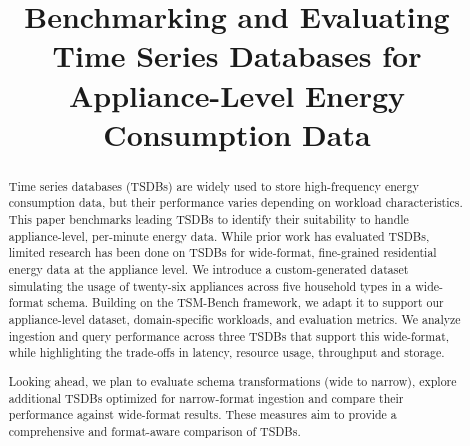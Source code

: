 \documentclass[conference]{IEEEtran}
\begin{document}
\title{Benchmarking and Evaluating Time Series Databases for Appliance-Level Energy Consumption Data\\
}

\author{
\and
{}
\and
{}
}

\maketitle

\begin{abstract}
Time series databases (TSDBs) are widely used to store high-frequency energy consumption data, but their performance varies depending on workload characteristics. This paper benchmarks leading TSDBs to identify their suitability to handle appliance-level, per-minute energy data. While prior work has evaluated TSDBs, limited research has been done on TSDBs for wide-format, fine-grained residential energy data at the appliance level. We introduce a custom-generated dataset simulating the usage of twenty-six appliances across five household types in a wide-format schema. Building on the TSM-Bench framework, we adapt it to support our appliance-level dataset, domain-specific workloads, and evaluation metrics. We analyze ingestion and query performance across three TSDBs that support this wide-format, while highlighting the trade-offs in latency, resource usage, throughput and storage.

Looking ahead, we plan to evaluate schema transformations (wide to narrow), explore additional TSDBs optimized for narrow-format ingestion and compare their performance against wide-format results. These measures aim to provide a comprehensive and  format-aware comparison of TSDBs.
\end{abstract}
\end{document}
